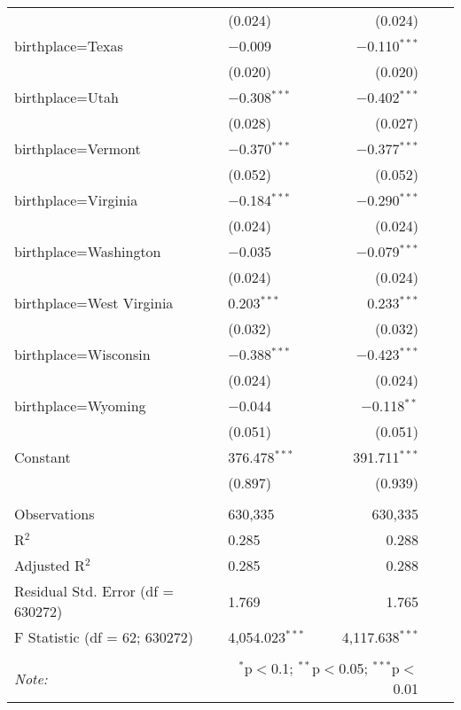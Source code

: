 \begin{longtable}{ll|rrr}
        & (0.024) & (0.024) \\ 
        birthplace=Texas & $-$0.009 & $-$0.110$^{***}$ \\ 
        & (0.020) & (0.020) \\ 
        birthplace=Utah & $-$0.308$^{***}$ & $-$0.402$^{***}$ \\ 
        & (0.028) & (0.027) \\ 
        birthplace=Vermont & $-$0.370$^{***}$ & $-$0.377$^{***}$ \\ 
        & (0.052) & (0.052) \\ 
        birthplace=Virginia & $-$0.184$^{***}$ & $-$0.290$^{***}$ \\ 
        & (0.024) & (0.024) \\ 
        birthplace=Washington & $-$0.035 & $-$0.079$^{***}$ \\ 
        & (0.024) & (0.024) \\ 
        birthplace=West Virginia & 0.203$^{***}$ & 0.233$^{***}$ \\ 
        & (0.032) & (0.032) \\ 
        birthplace=Wisconsin & $-$0.388$^{***}$ & $-$0.423$^{***}$ \\ 
        & (0.024) & (0.024) \\ 
        birthplace=Wyoming & $-$0.044 & $-$0.118$^{**}$ \\ 
        & (0.051) & (0.051) \\
        Constant & 376.478$^{***}$ & 391.711$^{***}$ \\ 
        & (0.897) & (0.939) \\ 
        \hline \\[-4ex] 
        Observations & 630,335 & 630,335 \\ 
        R$^{2}$ & 0.285 & 0.288 \\ 
        Adjusted R$^{2}$ & 0.285 & 0.288 \\ 
        Residual Std. Error (df = 630272) & 1.769 & 1.765 \\ 
        F Statistic (df = 62; 630272) & 4,054.023$^{***}$ & 4,117.638$^{***}$ \\  
    \hline 
    \hline \\[-4ex] 
    \textit{Note:}  & \multicolumn{2}{r}{$^{*}$p$<$0.1; $^{**}$p$<$0.05; $^{***}$p$<$0.01} \\
    \end{longtable}
    \endgroup
\newpage